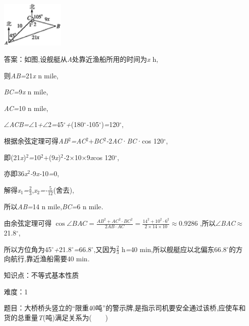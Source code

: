 \documentclass{article} %
\begin{document}
 \includegraphics*[width=1.22in, height=0.89in, keepaspectratio=false]{image1145}


答案：如图,设舰艇从\textit{A}处靠近渔船所用的时间为\textit{x} h,

则\textit{AB=}21\textit{x} n mile,

\textit{BC=}9\textit{x} n mile,

\textit{AC=}10 n mile,

$\mathrm{\angle}$\textit{ACB=}$\mathrm{\angle}$1\textit{+}$\mathrm{\angle}$2\textit{=}45$\mathrm{{}^\circ}$\textit{+}(180$\mathrm{{}^\circ}$\textit{-}105$\mathrm{{}^\circ}$)\textit{=}120$\mathrm{{}^\circ}$,

根据余弦定理可得\textit{AB}${}^{2}$\textit{=AC}${}^{2}$\textit{$+$BC}${}^{2}$\textit{-}2\textit{AC}·\textit{BC}·cos 120$\mathrm{{}^\circ}$,

即(21\textit{x})${}^{2}$\textit{=}10${}^{2}$\textit{$+$}(9\textit{x})${}^{2}$\textit{-}2\textit{$\times$}10\textit{$\times$}9\textit{x}cos 120$\mathrm{{}^\circ}$,

亦即36\textit{x}${}^{2}$\textit{-}9\textit{x-}10\textit{=}0,

解得\textit{x}${}_{1}$\textit{=}$\frac{2}{3}$,\textit{x}${}_{2}$\textit{=-}$\frac{5}{12}$(舍去),

所以\textit{AB=}14 n mile,\textit{BC=}6 n mile\textit{.}

由余弦定理可得
$\cos\angle BAC=\frac{{AB}^2+{AC}^2\cdot{BC}^2}{2AB\cdot AC}=\frac{14^2+10^2\cdot6^2}{2\times14\times10}\approx0.9286$
,所以$\mathrm{\angle}$\textit{BAC}$\mathrm{\approx}$21\textit{.}8$\mathrm{{}^\circ}$,

所以方位角为45$\mathrm{{}^\circ}$\textit{+}21\textit{.}8$\mathrm{{}^\circ}$\textit{=}66\textit{.}8$\mathrm{{}^\circ}$,又因为$\frac{2}{3}$ h\textit{=}40 min,所以舰艇应以北偏东66\textit{.}8$\mathrm{{}^\circ}$的方向航行,靠近渔船需要40 min\textit{.}


知识点：不等式基本性质

难度：1

 
题目：大桥桥头竖立的``限重40吨''的警示牌,是指示司机要安全通过该桥,应使车和货的总重量\textit{T}(吨)满足关系为(\textit{　　})

 \textit{　　　　　　} \textit{　　　　　　} \textit{　　　　　}
\end{document}
